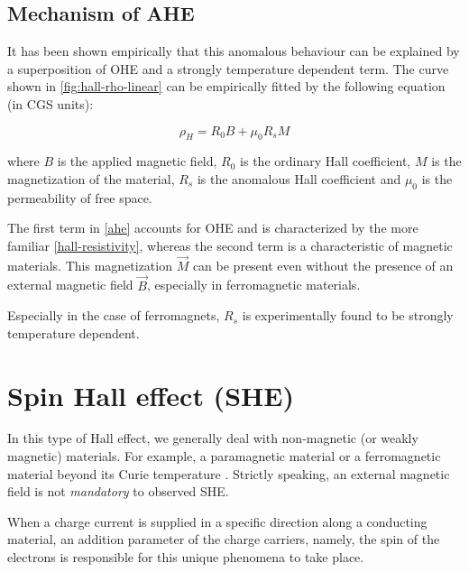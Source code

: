 \subsection{Mechanism of AHE}

It has been shown empirically that this anomalous behaviour can be explained by a superposition of OHE and a strongly temperature dependent term.
The curve shown in \cref{fig:hall-rho-linear}
can be empirically fitted by the following equation (in CGS units):

\begin{equation} \label{ahe}
    \rho_H = R_0 B + \mu_0 R_s M
\end{equation}

where $ B $ is the applied magnetic field, $ R_0 $ is the ordinary Hall coefficient, $ M $ is the magnetization of the material, $ R_s $ is the anomalous Hall coefficient and \( \mu_0 \) is the permeability of free space.

The first term in \cref{ahe} accounts for OHE and is characterized by the more familiar \cref{hall-resistivity}, whereas the second term is a characteristic of magnetic materials.
This magnetization $ \vec{M} $ can be present even without the presence of an external magnetic field $ \vec{B} $, especially in ferromagnetic materials.

Especially in the case of ferromagnets, $ R_s $ is experimentally found to be strongly temperature dependent.














\section{Spin Hall effect (SHE)} \label{sec:she}

In this type of Hall effect, we generally deal with non-magnetic (or weakly magnetic) materials.
For example, a paramagnetic material or a ferromagnetic material beyond its Curie temperature \cite{hirsch1999spin}.
Strictly speaking, an external magnetic field is not \textit{mandatory} to observed SHE.

When a charge current is supplied in a specific direction along a conducting material, an addition parameter of the charge carriers, namely, the spin of the electrons is responsible for this unique phenomena to take place.

